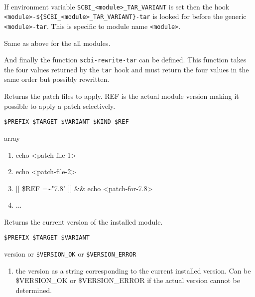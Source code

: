 \documentclass[a4paper,12pt,twoside]{article}
\newcommand{\code}[1]{\texttt{#1}}
\begin{document}
\begin{description}[font=\large\texttt]
	\begin{description}[style=standard]
		\item[\code{SCBI\_<module>\_TAR\_VARIANT}] \hfill \\
		If environment variable \code{SCBI\_<module>\_TAR\_VARIANT} is set then the hook \\ \code{<module>-\$\{SCBI\_<module>\_TAR\_VARIANT\}-tar} is looked for before the generic \code{<module>-tar}. This is specific to module name \code{<module>}.

		\item[\code{SCBI\_TAR\_VARIANT}] Same as above for the all modules.
	\end{description}

	And finally the function \code{scbi-rewrite-tar} can be defined. This function takes the four values returned by the \code{tar} hook and must return the four values in the same order but possibly rewritten.

	\item[<module>-patches] Returns the patch files to apply. REF is the actual module version making it possible to apply a patch selectively.

	\begin{description}[font=\textit,style=standard]
		\item[parameter] \tabto{2cm} \code{\$PREFIX \$TARGET \$VARIANT \$KIND \$REF}
		\item[return] \tabto{2cm} array
		\begin{enumerate}
			\item echo <patch-file-1>
			\item echo <patch-file-2>
			\item {[}{[} \$REF =\textasciitilde "7.8" {]}{]} \&\& echo <patch-for-7.8>
			\item ...
		\end{enumerate}
	\end{description}

	\item[<module>-version] Returns the current version of the installed module.
	\begin{description}[font=\textit,style=standard]
		\item[parameter] \tabto{2cm} \code{\$PREFIX \$TARGET \$VARIANT}
		\item[return] \tabto{2cm} version or \code{\$VERSION\_OK} or \code{\$VERSION\_ERROR}
		\begin{enumerate}
			\item the version as a string corresponding to the current installed version. Can be \$VERSION\_OK or \$VERSION\_ERROR if the actual version cannot be determined.
		\end{enumerate}
	\end{description}


\end{description}
\end{document}
